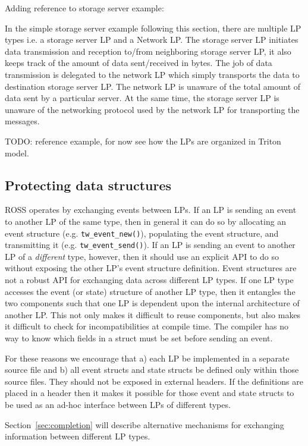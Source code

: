 \documentclass[conference,10pt,compsocconf,onecolumn]{IEEEtran}
\begin{document}
Adding reference to storage server example: 

In the simple storage server example following this section, there are multiple
LP types i.e. a storage server LP and a Network LP. The storage server LP initiates
data transmission and reception to/from neighboring storage server LP, it also keeps
track of the amount of data sent/received in bytes. The job of data transmission 
is delegated to the network LP which simply transports the data to destination storage 
server LP. The network LP is unaware of the total amount of data sent by a particular
server. At the same time, the storage server LP is unaware of the networking protocol
used by the network LP for transporting the messages. 

TODO: reference example, for now see how the LPs are organized in Triton
model.

\subsection{Protecting data structures}

ROSS operates by exchanging events between LPs.  If an LP is sending
an event to another LP of the same type, then in general it can do so
by allocating an event structure (e.g. \texttt{tw\_event\_new()}),
populating the event structure, and transmitting it
(e.g. \texttt{tw\_event\_send()}).  If an LP is sending an event to
another LP of a \emph{different} type, however, then it should use an
explicit API to do so without exposing the other LP's event structure
definition.  Event structures are not a robust API for exchanging data
across different LP types.  If one LP type accesses the event (or state)
structure of another LP type, then it entangles the two components such
that one LP is dependent upon the internal architecture of another LP.
This not only makes it difficult to reuse components, but also makes it
difficult to check for incompatibilities at compile time.  The compiler
has no way to know which fields in a struct must be set before sending
an event.

For these reasons we encourage that a) each LP be implemented in a separate
source file and b) all event structs and state structs
be defined only within those source files.  They should not be exposed in external
headers.  If the definitions are placed in a header then it makes it
possible for those event and state structs to be used as an ad-hoc interface
between LPs of different types.

Section~\ref{sec:completion} will describe alternative mechanisms for
exchanging information between different LP types.
\end{document}

